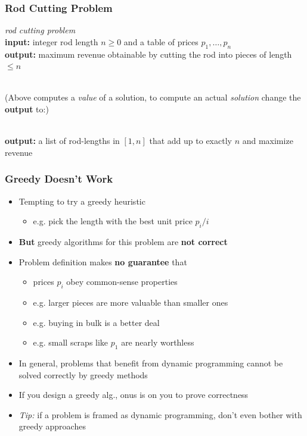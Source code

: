 \documentclass{beamer}
\newcommand{\stanza}{ \\~\ }
\begin{document}
\begin{frame} \frametitle{Rod Cutting Problem}

  \emph{rod cutting problem} \\
  \textbf{input:} integer rod length $n \geq 0$ and a table of prices $p_1, \ldots, p_n$ \\
  \textbf{output:} maximum revenue obtainable by cutting the rod into pieces of length $\leq n$ \stanza

  (Above computes a \emph{value} of a solution, to compute an actual
  \emph{solution} change the \textbf{output} to:)
  \stanza

  \textbf{output:} a list of rod-lengths in $[1, n]$ that add up to exactly $n$ and maximize revenue

\end{frame}

\begin{frame} \frametitle{Greedy Doesn't Work}

  \begin{itemize}
  \item Tempting to try a greedy heuristic
    \begin{itemize}
    \item e.g. pick the length with the best unit price $p_i/i$
    \end{itemize}
  \item \textbf{But} greedy algorithms for this problem are \textbf{not correct}
  \item Problem definition makes \textbf{no guarantee} that
    \begin{itemize}
    \item prices $p_i$ obey common-sense properties
    \item e.g. larger pieces are more valuable than smaller ones
    \item e.g. buying in bulk is a better deal
    \item e.g. small scraps like $p_1$ are nearly worthless
    \end{itemize}
  \item In general, problems that benefit from dynamic programming cannot be solved correctly by greedy methods
  \item If you design a greedy alg., onus is on you to prove correctness
  \item \emph{Tip:} if a problem is framed as dynamic programming, don't even bother with greedy approaches
  \end{itemize}
\end{frame}
\end{document}
